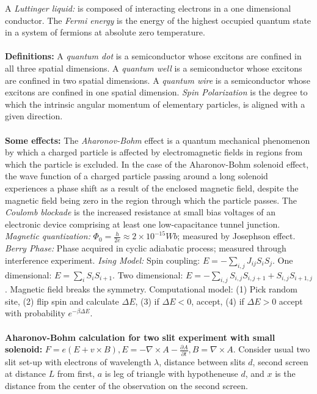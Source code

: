 A \emph{Luttinger liquid:} is composed of interacting electrons in a one dimensional conductor.
The \emph{Fermi energy} is the energy of the highest occupied quantum state 
in a system of fermions at absolute zero temperature.
\\
\\
{\bf Definitions:}
A \emph{quantum dot}
is a semiconductor whose excitons are confined in all three spatial dimensions. 
A \emph{quantum well}
is a semiconductor whose excitons are confined in two spatial dimensions. 
A \emph{quantum wire}
is a semiconductor whose excitons are confined in one spatial dimension. 
\emph{Spin Polarization}
is the degree to which the intrinsic angular momentum of elementary particles, 
is aligned with a given direction. 
\\
\\
{\bf Some effects:}
The \emph{Aharonov-Bohm}
effect is a quantum mechanical phenomenon by which a charged particle 
is affected by electromagnetic fields in regions from which the particle is excluded. 
In the case of the Aharonov-Bohm solenoid effect, 
the wave function of a charged particle passing around a long solenoid experiences a 
phase shift as a result of the enclosed magnetic field, 
despite the magnetic field being zero 
in the region through which the particle passes. 
The \emph{Coulomb blockade} is the increased resistance at small bias voltages of an 
electronic device comprising at least one low-capacitance tunnel junction.
\emph{Magnetic quantization:} $\Phi_0={\frac {h} {2e}} \approx 2 \times 10^{-15} Wb$; 
measured by Josephson effect.
\emph{Berry Phase:}  Phase acquired in cyclic adiabatic process; 
measured through interference experiment.
\emph{Ising Model:} Spin coupling: $E= - \sum_{i,j} J_{ij} S_i S_j$.  
One dimensional: $E= \sum_i S_i S_{i+1}$.
Two dimensional: $E= - \sum_{i,j} S_{i,j} S_{i, j+1} + S_{i,j} S_{i+1,j}$.  Magnetic field
breaks the symmetry.  Computational model: (1) Pick random site, 
(2) flip spin and calculate
$\Delta E$, (3) if $\Delta E <0$, accept, (4) if $\Delta E>0$ accept with probability
$e^{- \beta \Delta E}$.
\\
\\
{\bf Aharonov-Bohm calculation for two slit experiment with small solenoid:}
$F= e(E+v \times B), E= -\nabla \times A-{\frac {\partial A}{\partial t}}, B= \nabla \times A$.
Consider usual two slit set-up with electrons of wavelength $\lambda$, distance between slits $d$,
second screen at distance $L$ from first, $a$ is leg of triangle with hypotheneuse $d$, and $x$ is
the distance from the center of the observation on the second screen.
